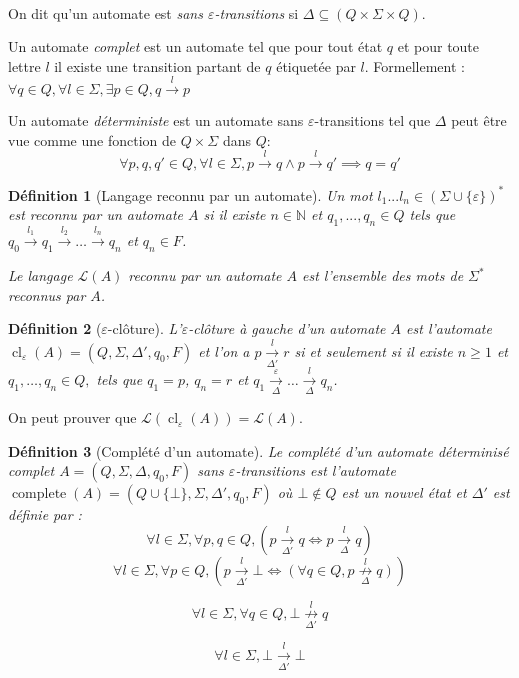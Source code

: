 \documentclass[conference]{IEEEtran}
\newtheorem{mydef}{D\'efinition}
\begin{document}
\paragraph{}
On dit qu'un automate est \emph{sans $\varepsilon$-transitions} si $\Delta \subseteq (Q\times \Sigma \times Q)$.

Un automate \emph{complet} est un automate tel que pour tout \'etat $q$ et pour toute lettre $l$ il existe une transition partant de $q$ \'etiquet\'ee par $l$. Formellement : $\forall q \in Q, \forall l \in \Sigma, \exists p\in Q, q\overset{l}{\to}p$

Un automate \emph{d\'eterministe} est un automate sans $\varepsilon$-transitions tel que $\Delta$ peut \^etre vue comme une fonction de $Q\times \Sigma$ dans $Q$: $$\forall p,q,q' \in Q, \forall l \in \Sigma, p\overset{l}{{\to}}q \land p\overset{l}{{\to}}q' \implies q=q'$$

\begin{mydef}[Langage reconnu par un automate]
Un mot $l_1...l_n \in \left(\Sigma\cup \{\varepsilon\}\right)^*$ est reconnu par un automate $A$ si il existe $n \in \mathbb N$ et $q_1,...,q_n \in Q$ tels que $q_0 \overset{l_1}{{\to}} q_1 \overset{l_2}{{\to}} \dots \overset{l_n}{{\to}} q_{n}$ et $q_{n} \in F$.

Le langage $\mathcal{L}(A)$ reconnu par un automate $A$ est l'ensemble des mots de $\Sigma^*$ reconnus par $A$.
\end{mydef}

\begin{mydef}[$\varepsilon$-clôture]
L'$\varepsilon$-clôture \`a gauche  d'un automate $A$ est l'automate $\operatorname{cl}_\varepsilon(A) = (Q, \Sigma, \Delta', q_0, F)$ et l'on a $p \underset{\Delta'}{\overset{l}{{\to}}} r$ si et seulement si il existe $n\ge 1$ et $q_1,\dots,q_n \in Q,$ tels que $q_1 = p$, $q_n = r$ et $q_1 \underset{\Delta}{\overset{\varepsilon}{{\to}}} \dots \underset{\Delta}{\overset{l}{{\to}}} q_n$.
\end{mydef}
On peut prouver que $\mathcal L(\operatorname{cl}_\varepsilon(A))=\mathcal L(A)$.

\begin{mydef}[Compl\'et\'e d'un automate]
Le compl\'et\'e d'un automate déterminisé complet $A = (Q, \Sigma, \Delta, q_0, F)$ sans $\varepsilon$-transitions est l'automate $\operatorname{complete}(A) = (Q\cup\{\bot\}, \Sigma, \Delta', q_0, F)$ o\`u $\bot\not\in Q$ est un nouvel \'etat et $\Delta'$ est d\'efinie par :
$$\forall l \in \Sigma,\forall p,q \in Q, \left(p\underset{\Delta'}{\overset{l}{{\to}}}q \iff p\underset{\Delta}{\overset{l}{{\to}}}q\right)$$
$$\forall l \in \Sigma, \forall p \in Q, \left(p\underset{\Delta'}{\overset{l}{{\to}}}\bot \iff \left(\forall q \in Q, p\underset{\Delta}{\overset{l}{{\not\to}}}q\right)\right)$$

$$\forall l \in \Sigma, \forall q \in Q,\bot\underset{\Delta'}{\overset{l}{{\not\to}}}q$$

$$\forall l \in \Sigma, \bot\underset{\Delta'}{\overset{l}{{\to}}}\bot$$
\end{mydef}
\end{document}
